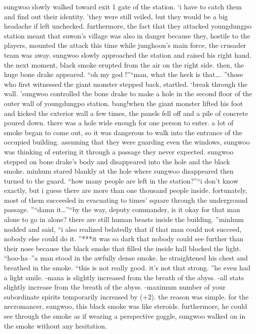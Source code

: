 sungwoo slowly walked toward exit 1 gate of the station.
‘i have to catch them and find out their identity.
’they were still veiled, but they would be a big headache if left unchecked.
furthermore, the fact that they attacked youngdungpo station meant that suwon’s village was also in danger because they, hostile to the players, mounted the attack this time while junghoon’s main force, the crusader team was away.
sungwoo slowly approached the station and raised his right hand.
 the next moment, black smoke erupted from the air on the right side.
 then, the huge bone drake appeared.
“oh my god !”“man, what the heck is that….
”those who first witnessed the giant monster stepped back, startled.
‘break through the wall.
’sungwoo controlled the bone drake to make a hole in the second floor of the outer wall of youngdungpo station.
bang!when the giant monster lifted his foot and kicked the exterior wall a few times, the panels fell off and a pile of concrete poured down.
 there was a hole wide enough for one person to enter.
a lot of smoke began to come out, so it was dangerous to walk into the entrance of the occupied building.
 assuming that they were guarding even the windows, sungwoo was thinking of entering it through a passage they never expected.
sungwoo stepped on bone drake’s body and disappeared into the hole and the black smoke.
minhum stared blankly at the hole where sungwoo disappeared then turned to the guard.
“how many people are left in the station?”“i don’t know exactly, but i guess there are more than one thousand people inside.
 fortunately, most of them succeeded in evacuating to times’ square through the underground passage.
”“damn it…”“by the way, deputy commander, is it okay for that man alone to go in alone? there are still human beasts inside the building.
”minhum nodded and said, “i also realized belatedly that if that man could not succeed, nobody else could do it.
”***it was so dark that nobody could see further than their nose because the black smoke that filled the inside hall blocked the light.
“hoo-ha–”a man stood in the awfully dense smoke.
 he straightened his chest and breathed in the smoke.
“this is not really good.
 it’s not that strong.
”he even had a light smile.
-mana is slightly increased from the breath of the abyss.
-all stats slightly increase from the breath of the abyss.
-maximum number of your subordinate spirits temporarily increased by (+2).
the reason was simple.
 for the necromancer, sungwoo, this black smoke was like steroids.
 furthermore, he could see through the smoke as if wearing a perspective goggle, sungwoo walked on in the smoke without any hesitation.
